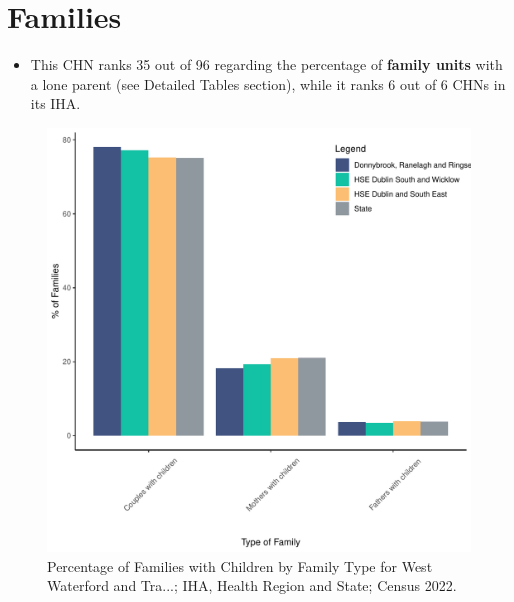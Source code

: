 \documentclass{article}
\begin{document}
\section{Families}\label{sect:Fam}
\begin{itemize}
\item This CHN ranks  35 out of 96 regarding the percentage of \textbf{family units} with a lone parent (see Detailed Tables section), while it ranks   6 out of 6 CHNs in its IHA.
\end{itemize}
\begin{figure}[H]
	\centering
	\includegraphics[width = 150mm]{../figures/FamED.pdf}
	\caption{Percentage of Families with Children by Family Type for West Waterford and Tra...; IHA, Health Region and State; Census 2022.}
	\label{fig:vbnv}
	\end{figure}
	
\end{document}
